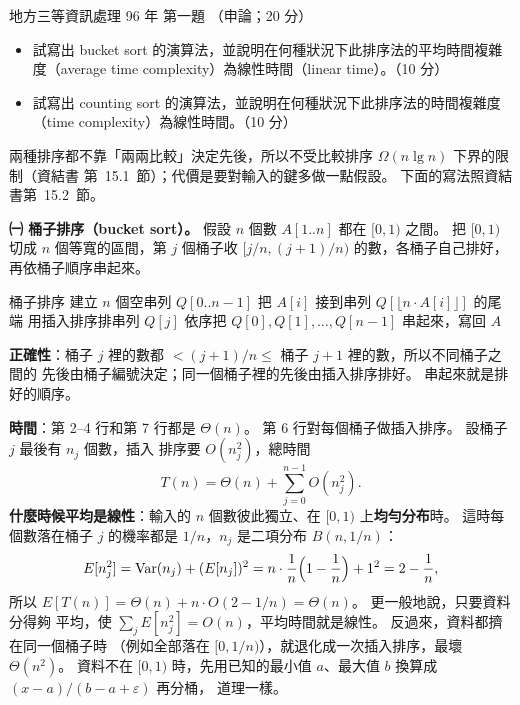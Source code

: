 \begin{pastexam}[label={px:df3-096-ds-01}]{地方三等資訊處理 96 年 第一題}
（申論；20 分）

\begin{itemize}[leftmargin=2em, labelsep=0.3em, itemsep=2pt]
\item[㈠] 試寫出 bucket sort 的演算法，並說明在何種狀況下此排序法的平均時間複雜度（average
time complexity）為線性時間（linear time）。（10 分）
\item[㈡] 試寫出 counting sort 的演算法，並說明在何種狀況下此排序法的時間複雜度（time
complexity）為線性時間。（10 分）
\end{itemize}
\end{pastexam}

\begin{pastsoln}
兩種排序都不靠「兩兩比較」決定先後，所以不受比較排序 $\Omega(n \lg n)$ 下界的限制（資結書
第~15.1~節）；代價是要對輸入的鍵多做一點假設。 下面的寫法照資結書第~15.2~節。

\textbf{㈠ 桶子排序（bucket sort）。} 假設 $n$ 個數 $A[1..n]$ 都在 $[0, 1)$ 之間。 把
$[0, 1)$ 切成 $n$ 個等寬的區間，第 $j$ 個桶子收 $[j/n, (j+1)/n)$ 的數，各桶子自己排好，
再依桶子順序串起來。
\begin{pseudo}{桶子排序}
    \State 建立 $n$ 個空串列 $Q[0..n-1]$
        \State 把 $A[i]$ 接到串列 $Q[\lfloor n \cdot A[i] \rfloor]$ 的尾端
    \EndFor
        \State 用插入排序排串列 $Q[j]$
    \EndFor
    \State 依序把 $Q[0], Q[1], \ldots, Q[n-1]$ 串起來，寫回 $A$
\EndProcedure
\end{pseudo}
\textbf{正確性}：桶子 $j$ 裡的數都 $< (j+1)/n \le$ 桶子 $j+1$ 裡的數，所以不同桶子之間的
先後由桶子編號決定；同一個桶子裡的先後由插入排序排好。 串起來就是排好的順序。

\textbf{時間}：第 2--4 行和第 7 行都是 $\Theta(n)$。 第 6 行對每個桶子做插入排序。 設桶子 $j$ 最後有 $n_j$ 個數，插入
排序要 $O(n_j^2)$，總時間
\[
T(n) = \Theta(n) + \sum_{j=0}^{n-1} O(n_j^2).
\]
\textbf{什麼時候平均是線性}：輸入的 $n$ 個數彼此獨立、在 $[0, 1)$ 上\textbf{均勻分布}時。
這時每個數落在桶子 $j$ 的機率都是 $1/n$，$n_j$ 是二項分布 $B(n, 1/n)$：
\[
E[n_j^2] = \mathrm{Var}(n_j) + (E[n_j])^2 = n \cdot \frac{1}{n}\Bigl(1 - \frac{1}{n}\Bigr) + 1^2
= 2 - \frac{1}{n},
\]
所以 $E[T(n)] = \Theta(n) + n \cdot O(2 - 1/n) = \Theta(n)$。 更一般地說，只要資料分得夠
平均，使 $\sum_j E[n_j^2] = O(n)$，平均時間就是線性。 反過來，資料都擠在同一個桶子時
（例如全部落在 $[0, 1/n)$），就退化成一次插入排序，最壞 $\Theta(n^2)$。 資料不在
$[0, 1)$ 時，先用已知的最小值 $a$、最大值 $b$ 換算成 $(x - a)/(b - a + \varepsilon)$ 再分桶，
道理一樣。


\end{pastsoln}
